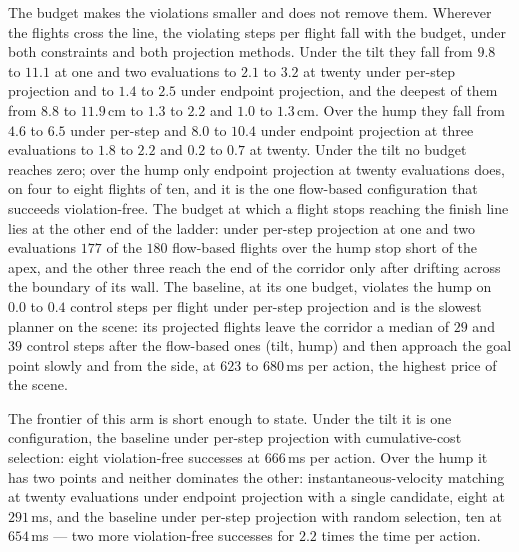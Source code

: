 The budget makes the violations smaller and does not remove them. Wherever the flights cross the line,
the violating steps per flight fall with the budget, under both constraints and both projection methods.
Under the tilt they fall from
$9.8$ to $11.1$ at one and two evaluations to $2.1$ to $3.2$ at twenty under per-step projection and to
$1.4$ to $2.5$ under endpoint projection, and the deepest of them from $8.8$ to $11.9$\,cm to $1.3$ to
$2.2$ and $1.0$ to $1.3$\,cm. Over the hump they fall from $4.6$ to $6.5$ under per-step and $8.0$ to
$10.4$ under endpoint projection at three evaluations to $1.8$ to $2.2$ and $0.2$ to $0.7$ at twenty.
Under the tilt no budget reaches zero; over the hump only endpoint projection at twenty evaluations does,
on four to eight flights of ten, and it is the one flow-based configuration that succeeds violation-free.
The budget at
which a flight stops reaching the finish line lies at the other end of the ladder: under per-step
projection at one and two evaluations $177$ of the $180$ flow-based flights over the hump stop short of
the apex, and the other three reach the end of the corridor only after drifting across the boundary of its
wall. The baseline, at its one budget, violates the hump on $0.0$ to $0.4$ control steps per flight under
per-step projection and is the slowest planner on the scene: its projected flights leave the corridor a
median of $29$ and $39$ control steps after the flow-based ones (tilt, hump) and then approach the goal
point slowly and from the side, at $623$ to $680$\,ms per action, the highest price of the scene.

The frontier of this arm is short enough to state. Under the tilt it is one configuration, the baseline
under per-step projection with cumulative-cost selection: eight violation-free successes at $666$\,ms per
action. Over the hump it has two points and neither dominates the other: instantaneous-velocity matching at
twenty evaluations under endpoint projection with a single candidate, eight at $291$\,ms, and the baseline
under per-step projection with random selection, ten at $654$\,ms --- two more violation-free successes
for $2.2$ times the time per action.

